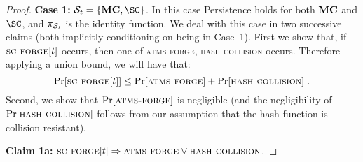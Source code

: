 \begin{proof}
  \textbf{Case 1:}
  $\Secure_t = \{\MC,\SC\}$.
  In this case Persistence holds for both $\mathbf{MC}$ and $\SC$,
  and $\pi_{\mathcal{S}_t}$ is the identity function.
  We deal with this case in two successive claims (both implicitly conditioning
  on being in Case~1).
  First we show that, if $\textsc{sc-forge}[t]$ occurs, then one of
  \textsc{atms-forge}, \textsc{hash-collision} occurs.
  Therefore applying a union bound, we will have that:
  \begin{equation*}
    \label{ineq}
  \Pr[\textsc{sc-forge}[t]] \leq \Pr[\textsc{atms-forge}] + \Pr[\textsc{hash-collision}]
  \; .
  \end{equation*}
  Second, we show that $\Pr[\textsc{atms-forge}]$ is
  negligible (and the negligibility of $\Pr[\textsc{hash-collision}]$ follows from our assumption
  that the hash function is collision resistant).

  \textbf{Claim 1a:}
  $\textsc{sc-forge}[t] \Rightarrow \textsc{atms-forge} \lor \textsc{hash-collision}$.


\end{proof}
